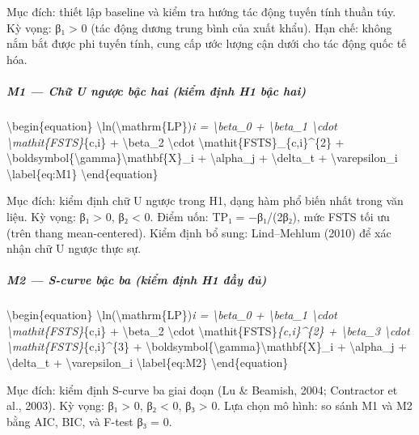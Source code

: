 \documentclass[12pt,a4paper]{article}
\begin{document}
Mục đích: thiết lập baseline và kiểm tra hướng tác động tuyến tính thuần
túy. Kỳ vọng: β₁ \textgreater{} 0 (tác động dương trung bình của xuất
khẩu). Hạn chế: không nắm bắt được phi tuyến tính, cung cấp ước lượng
cận dưới cho tác động quốc tế hóa.

\hypertarget{m1--chux1eef-u-ngux1b0ux1ee3c-bux1eadc-hai-kiux1ec3m-ux111ux1ecbnh-h1-bux1eadc-hai}{%
\subparagraph{M1 --- Chữ U ngược bậc hai (kiểm định H1 bậc
hai)}\label{m1--chux1eef-u-ngux1b0ux1ee3c-bux1eadc-hai-kiux1ec3m-ux111ux1ecbnh-h1-bux1eadc-hai}}

\textbackslash begin\{equation\}
\textbackslash ln(\textbackslash mathrm\{LP\})\emph{i =
\textbackslash beta\_0 + \textbackslash beta\_1 \textbackslash cdot
\textbackslash mathit\{FSTS\}}\{c,i\} + \textbackslash beta\_2
\textbackslash cdot \textbackslash mathit\{FSTS\}\_\{c,i\}\^{}\{2\} +
\textbackslash boldsymbol\{\textbackslash gamma\}\textquotesingle\textbackslash mathbf\{X\}\_i
+ \textbackslash alpha\_j + \textbackslash delta\_t +
\textbackslash varepsilon\_i \textbackslash label\{eq:M1\}
\textbackslash end\{equation\}

Mục đích: kiểm định chữ U ngược trong H1, dạng hàm phổ biến nhất trong
văn liệu. Kỳ vọng: β₁ \textgreater{} 0, β₂ \textless{} 0. Điểm uốn: TP₁
= −β₁/(2β₂), mức FSTS tối ưu (trên thang mean-centered). Kiểm định bổ
sung: Lind--Mehlum (2010) để xác nhận chữ U ngược thực sự.

\hypertarget{m2--s-curve-bux1eadc-ba-kiux1ec3m-ux111ux1ecbnh-h1-ux111ux1ea7y-ux111ux1ee7}{%
\subparagraph{M2 --- S-curve bậc ba (kiểm định H1 đầy
đủ)}\label{m2--s-curve-bux1eadc-ba-kiux1ec3m-ux111ux1ecbnh-h1-ux111ux1ea7y-ux111ux1ee7}}

\textbackslash begin\{equation\}
\textbackslash ln(\textbackslash mathrm\{LP\})\emph{i =
\textbackslash beta\_0 + \textbackslash beta\_1 \textbackslash cdot
\textbackslash mathit\{FSTS\}}\{c,i\} + \textbackslash beta\_2
\textbackslash cdot \textbackslash mathit\{FSTS\}\emph{\{c,i\}\^{}\{2\}
+ \textbackslash beta\_3 \textbackslash cdot
\textbackslash mathit\{FSTS\}}\{c,i\}\^{}\{3\} +
\textbackslash boldsymbol\{\textbackslash gamma\}\textquotesingle\textbackslash mathbf\{X\}\_i
+ \textbackslash alpha\_j + \textbackslash delta\_t +
\textbackslash varepsilon\_i \textbackslash label\{eq:M2\}
\textbackslash end\{equation\}

Mục đích: kiểm định S-curve ba giai đoạn (Lu \& Beamish, 2004;
Contractor et al., 2003). Kỳ vọng: β₁ \textgreater{} 0, β₂ \textless{}
0, β₃ \textgreater{} 0. Lựa chọn mô hình: so sánh M1 và M2 bằng AIC,
BIC, và F-test β₃ = 0.
\end{document}
